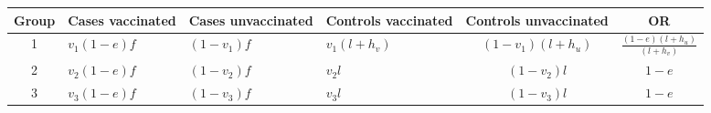 \begin{tabular}{cp{5em}p{5em}p{5em}cc}
\toprule
Group & Cases vaccinated & Cases unvaccinated & Controls vaccinated & Controls unvaccinated & OR \\
\midrule
1 & $v_1(1-e)f$ & $(1-v_1)f$ & $v_1(l+h_v)$ & $(1-v_1)(l+h_u)$ & $\frac{(1-e)(l+h_u)}{(l+h_v)}$ \\
2 & $v_2(1-e)f$ & $(1-v_2)f$ & $v_2l$ & $(1-v_2)l$ & $1-e$ \\
3 & $v_3(1-e)f$ & $(1-v_3)f$ & $v_3l$ & $(1-v_3)l$ & $1-e$ \\
\bottomrule
\end{tabular}